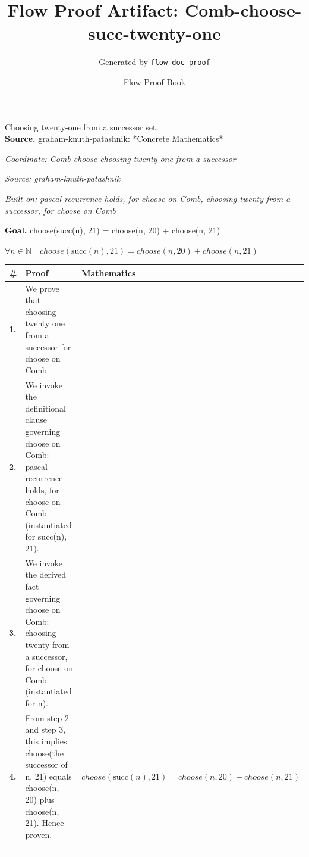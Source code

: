 \documentclass[11pt]{article}
\title{Flow Proof Artifact: Comb-choose-succ-twenty-one}
\author{Generated by \texttt{flow doc proof}}
\date{Flow Proof Book}
\theoremstyle{definition}
\begin{document}
\maketitle
Choosing twenty-one from a successor set.\\[0.5em]
\textbf{Source.} graham-knuth-patashnik: *Concrete Mathematics*\\[0.5em]
\bigskip
{}\par
\smallskip\noindent\textit{Coordinate: Comb \cdot choose \cdot choosing twenty one from a successor}\par
\smallskip\noindent\textit{Source: graham-knuth-patashnik}\par
\smallskip\noindent\textit{Built on: pascal recurrence holds, for choose on Comb, choosing twenty from a successor, for choose on Comb}\par
\medskip
\noindent\textbf{Goal.} choose(succ(n), 21) = choose(n, 20) + choose(n, 21)\par
\noindent$\displaystyle \forall n \in \mathbb{N}\quad choose(\mathrm{succ}(n), 21) = choose(n, 20) + choose(n, 21)$\par
\medskip
\noindent
\begin{tabular}{@{} >{\raggedright\arraybackslash}p{} >{\raggedright\arraybackslash}p{} >{\raggedleft\arraybackslash}p{} @{}}
\textbf{\#} & \textbf{Proof} & \textbf{Mathematics} \\
\midrule
\textbf{1.} & We prove that choosing twenty one from a successor for choose on Comb. & \\[0.45em]
\textbf{2.} & We invoke the definitional clause governing choose on Comb: pascal recurrence holds, for choose on Comb (instantiated for succ(n), 21). & \\[0.45em]
\textbf{3.} & We invoke the derived fact governing choose on Comb: choosing twenty from a successor, for choose on Comb (instantiated for n). & \\[0.45em]
\textbf{4.} & From step 2 and step 3, this implies choose(the successor of n, 21) equals choose(n, 20) plus choose(n, 21). Hence proven. & $\displaystyle choose(\mathrm{succ}(n), 21) = choose(n, 20) + choose(n, 21)$ \\[0.45em]
\bottomrule
\end{tabular}
\label{thm:Comb-choose-choosing_twenty_one_from_a_successor}
\par\medskip\hrule
\end{document}
